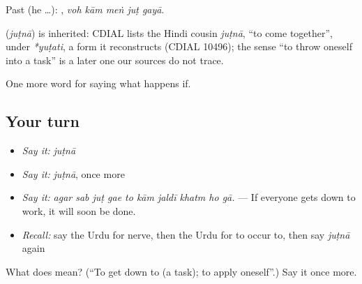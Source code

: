Past (he …):     , \emph{voh kām meṅ juṭ gayā}.

\begin{cousinweb}
\textbf{} (\emph{juṭnā}) is inherited: CDIAL lists the Hindi cousin \emph{juṭnā}, \textquotedblleft{}to come together\textquotedblright{}, under \emph{*yuṭati}, a form it reconstructs (CDIAL 10496); the sense \textquotedblleft{}to throw oneself into a task\textquotedblright{} is a later one our sources do not trace.
\end{cousinweb}

\begin{grammarlens}[title={What you've built}]
One more word for saying what happens if.
\end{grammarlens}

\subsection*{Your turn}
\begin{itemize}
\raggedright
  \item \emph{Say it:} \emph{juṭnā}
  \item \emph{Say it:} \emph{juṭnā}, once more
  \item \emph{Say it:} \emph{agar sab juṭ gae to kām jaldī khatm ho gā.} — If everyone gets down to work, it will soon be done.
  \item \emph{Recall:} say the Urdu for nerve, then the Urdu for to occur to, then say \emph{juṭnā} again
\end{itemize}

\begin{tcolorbox}[breakable,colback=teal!4,colframe=teal!35!black,title={Before you move on}]
What does  mean? (\textquotedblleft{}To get down to (a task); to apply oneself\textquotedblright{}.) Say it once more.
\end{tcolorbox}
